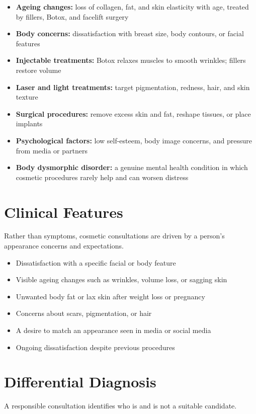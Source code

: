 \begin{itemize}
    \item \textbf{Ageing changes:} loss of collagen, fat, and skin elasticity with age, treated by fillers, Botox, and facelift surgery
    \item \textbf{Body concerns:} dissatisfaction with breast size, body contours, or facial features
    \item \textbf{Injectable treatments:} Botox relaxes muscles to smooth wrinkles; fillers restore volume
    \item \textbf{Laser and light treatments:} target pigmentation, redness, hair, and skin texture
    \item \textbf{Surgical procedures:} remove excess skin and fat, reshape tissues, or place implants
    \item \textbf{Psychological factors:} low self-esteem, body image concerns, and pressure from media or partners
    \item \textbf{Body dysmorphic disorder:} a genuine mental health condition in which cosmetic procedures rarely help and can worsen distress
\end{itemize}

\section*{Clinical Features}
Rather than symptoms, cosmetic consultations are driven by a person's appearance concerns and expectations.

\begin{itemize}
    \item Dissatisfaction with a specific facial or body feature
    \item Visible ageing changes such as wrinkles, volume loss, or sagging skin
    \item Unwanted body fat or lax skin after weight loss or pregnancy
    \item Concerns about scars, pigmentation, or hair
    \item A desire to match an appearance seen in media or social media
    \item Ongoing dissatisfaction despite previous procedures
\end{itemize}

\section*{Differential Diagnosis}
A responsible consultation identifies who is and is not a suitable candidate.

